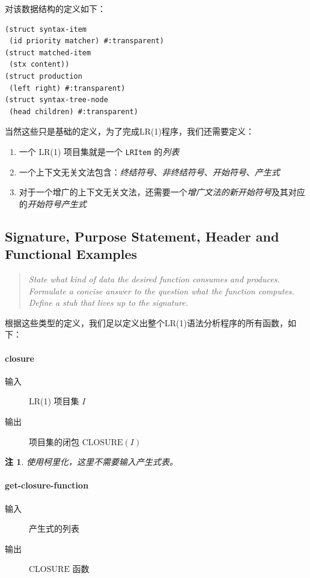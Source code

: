 \documentclass[lang=cn]{ctexart}
\newtheorem{remark}{注}
\begin{document}
{对该数据结构的定义如下：

\begin{lstlisting}[caption={types.rkt}]
(struct syntax-item
 (id priority matcher) #:transparent)
(struct matched-item
 (stx content))
(struct production
 (left right) #:transparent)
(struct syntax-tree-node
 (head children) #:transparent)
\end{lstlisting}

当然这些只是基础的定义，为了完成LR(1)程序，我们还需要定义：

\begin{enumerate}
	\item 一个 LR(1) 项目集就是一个 \lstinline|LRItem| 的\textit{列表}
	\item 一个上下文无关文法包含：\textit{终结符号}、\textit{非终结符号}、\textit{开始符号}、\textit{产生式}
	\item 对于一个增广的上下文无关文法，还需要一个\textit{增广文法的新开始符号}及其对应的\textit{开始符号产生式}
\end{enumerate}

\subsection{Signature, Purpose Statement, Header and Functional Examples}

\begin{quotation}
	\textit{State what kind of data the desired function consumes and produces. Formulate a concise answer to the question what the function computes. Define a stub that lives up to the signature.}
\end{quotation}

根据这些类型的定义，我们足以定义出整个LR(1)语法分析程序的所有函数，如下：

\paragraph{closure}
\begin{description}
	\item[输入] LR(1) 项目集 $I$
	\item[输出] 项目集的闭包 $\mathrm{CLOSURE}(I)$
\end{description}

\begin{remark}
	使用柯里化，这里不需要输入产生式表。
\end{remark}

\paragraph{get-closure-function}
\begin{description}
	\item[输入] 产生式的列表
	\item[输出] $\mathrm{CLOSURE}$ 函数
\end{description}

}
\end{document}
